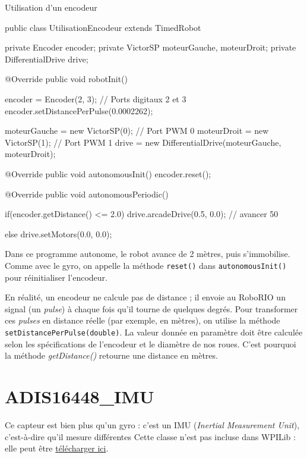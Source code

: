 \documentclass[12pt]{report}
\begin{document}
\begin{MyTCB}{Utilisation d'un encodeur}

public class UtilisationEncodeur extends TimedRobot {

	private Encoder encoder;
	private VictorSP moteurGauche, moteurDroit;
	private DifferentialDrive drive;
	
	@Override
	public void robotInit() {
	
		encoder = Encoder(2, 3); // Ports digitaux 2 et 3
		encoder.setDistancePerPulse(0.0002262);

		moteurGauche = new VictorSP(0); // Port PWM 0
		moteurDroit = new VictorSP(1); // Port PWM 1
		drive = new DifferentialDrive(moteurGauche, moteurDroit);

	}
	
	@Override
	public void autonomousInit() {
		encoder.reset();
	}
	
	@Override
	public void autonomousPeriodic() {

		if(encoder.getDistance() <= 2.0)
			drive.arcadeDrive(0.5, 0.0); // avancer 50%
			
		else
			drive.setMotors(0.0, 0.0);		
		
	}

}

\end{MyTCB}

Dans ce programme autonome, le robot avance de 2 mètres, puis s'immobilise. Comme avec le gyro, on appelle la méthode \texttt{reset()} dans \texttt{autonomousInit()} pour réinitialiser l'encodeur. 

En réalité, un encodeur ne calcule pas de distance ; il envoie au RoboRIO un signal (un \textit{pulse}) à chaque fois qu'il tourne de quelques degrés. Pour transformer ces \textit{pulses} en distance réelle (par exemple, en mètres), on utilise la méthode \texttt{setDistancePerPulse(double)}. La valeur donnée en paramètre doit être calculée selon les spécifications de l'encodeur et le diamètre de nos roues. C'est pourquoi la méthode \textit{getDistance()} retourne une distance en mètres.

\section{ADIS16448\_IMU}\label{adis16448}

Ce capteur est bien plus qu'un gyro : c'est un IMU (\textit{Inertial Measurement Unit}), c'est-à-dire qu'il mesure différentes  Cette classe n'est pas incluse dans WPILib : elle peut être \href{https://github.com/juchong/ADIS16448-RoboRIO-Driver/blob/master/Java/src/main/java/com/analog/adis16448/frc/ADIS16448_IMU.java}{télécharger ici}.
\end{document}
